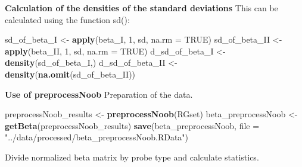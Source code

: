 \documentclass[
  11pt,
]{article}
\newenvironment{Shaded}{\begin{snugshade}}{\end{snugshade}}
\newcommand{\AttributeTok}[1]{\textcolor[rgb]{0.13,0.29,0.53}{#1}}
\newcommand{\ConstantTok}[1]{\textcolor[rgb]{0.56,0.35,0.01}{#1}}
\newcommand{\DecValTok}[1]{\textcolor[rgb]{0.00,0.00,0.81}{#1}}
\newcommand{\FunctionTok}[1]{\textcolor[rgb]{0.13,0.29,0.53}{\textbf{#1}}}
\newcommand{\NormalTok}[1]{#1}
\newcommand{\OtherTok}[1]{\textcolor[rgb]{0.56,0.35,0.01}{#1}}
\newcommand{\StringTok}[1]{\textcolor[rgb]{0.31,0.60,0.02}{#1}}
\begin{document}
\textbf{Calculation of the densities of the standard deviations} This
can be calculated using the function sd():

\begin{Shaded}
\begin{Highlighting}[]
\NormalTok{sd\_of\_beta\_I }\OtherTok{\textless{}{-}} \FunctionTok{apply}\NormalTok{(beta\_I, }\DecValTok{1}\NormalTok{, sd, }\AttributeTok{na.rm =} \ConstantTok{TRUE}\NormalTok{)}
\NormalTok{sd\_of\_beta\_II }\OtherTok{\textless{}{-}} \FunctionTok{apply}\NormalTok{(beta\_II, }\DecValTok{1}\NormalTok{, sd, }\AttributeTok{na.rm =} \ConstantTok{TRUE}\NormalTok{)}
\NormalTok{d\_sd\_of\_beta\_I }\OtherTok{\textless{}{-}} \FunctionTok{density}\NormalTok{(sd\_of\_beta\_I,)}
\NormalTok{d\_sd\_of\_beta\_II }\OtherTok{\textless{}{-}} \FunctionTok{density}\NormalTok{(}\FunctionTok{na.omit}\NormalTok{(sd\_of\_beta\_II))}
\end{Highlighting}
\end{Shaded}

\textbf{Use of preprocessNoob} Preparation of the data.

\begin{Shaded}
\begin{Highlighting}[]
\NormalTok{preprocessNoob\_results }\OtherTok{\textless{}{-}} \FunctionTok{preprocessNoob}\NormalTok{(RGset)}
\NormalTok{beta\_preprocessNoob }\OtherTok{\textless{}{-}} \FunctionTok{getBeta}\NormalTok{(preprocessNoob\_results)}
\FunctionTok{save}\NormalTok{(beta\_preprocessNoob, }\AttributeTok{file =} \StringTok{"../data/processed/beta\_preprocessNoob.RData"}\NormalTok{)}
\end{Highlighting}
\end{Shaded}

Divide normalized beta matrix by probe type and calculate statistics.
\end{document}
